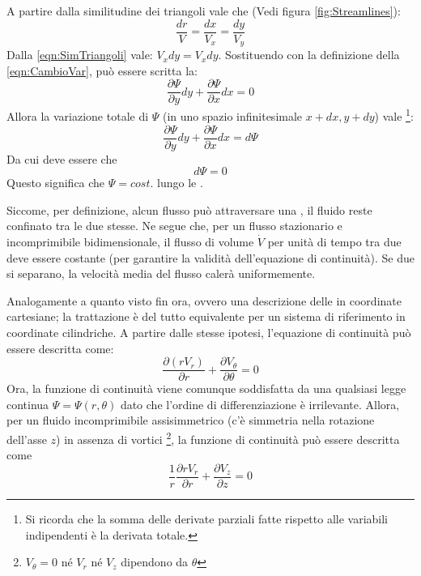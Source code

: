 A partire dalla similitudine dei triangoli vale che (Vedi figura \ref{fig:Streamlines}):
\begin{equation}
\frac{dr}{V} = \frac{dx}{V_x} = \frac{dy}{V_y}
\label{eqn:SimTriangoli}
\end{equation}
Dalla \eqref{eqn:SimTriangoli} vale: $V_x dy = V_x dy$.
Sostituendo con la definizione della \eqref{eqn:CambioVar}, può essere scritta la:
\begin{equation}
\frac{\partial \Psi}{\partial y} dy + \frac{\partial \Psi}{\partial x} dx = 0
\end{equation}
Allora la variazione totale di $\Psi$ (in uno spazio infinitesimale $x+dx, y+dy$) vale%
\footnote{Si ricorda che la somma delle derivate parziali fatte rispetto alle variabili indipendenti è la derivata totale.}:
\begin{equation}
\frac{\partial \Psi}{\partial y} dy + \frac{\partial \Psi}{\partial x} dx = d\Psi
\end{equation}
Da cui deve essere che 
\begin{equation}
d\Psi = 0
\end{equation}
Questo significa che $\Psi = cost.$ lungo le .

Siccome, per definizione, alcun flusso può attraversare una , il fluido reste confinato tra le due stesse.
Ne segue che, per un flusso stazionario e incomprimibile bidimensionale, il flusso di volume $\dot{V}$ per unità di tempo tra due  deve essere costante (per garantire la validità dell'equazione di continuità).
Se due  si separano, la velocità media del flusso calerà uniformemente.

Analogamente a quanto visto fin ora, ovvero una descrizione delle  in coordinate cartesiane; la trattazione è del tutto equivalente per un sistema di riferimento in coordinate cilindriche.
A partire dalle stesse ipotesi, l'equazione di continuità può essere descritta come:
\begin{equation}
\frac{\partial (r V_r)}{\partial r} + \frac{\partial V_{\theta}}{\partial \theta} = 0
\end{equation}
Ora, la funzione di continuità viene comunque soddisfatta da una qualsiasi legge continua $\Psi = \Psi(r,\theta)$ dato che l'ordine di differenziazione è irrilevante.
Allora, per un fluido incomprimibile assisimmetrico (c'è simmetria nella rotazione dell'asse $z$) in assenza di vortici%
\footnote{$V_{\theta} = 0$ né $V_r$ né $V_z$ dipendono da $\theta$}, la funzione di continuità può essere descritta come
\begin{equation}
\frac{1}{r}\frac{\partial r V_r}{\partial r} + \frac{\partial V_z}{\partial z}  = 0
\end{equation}


